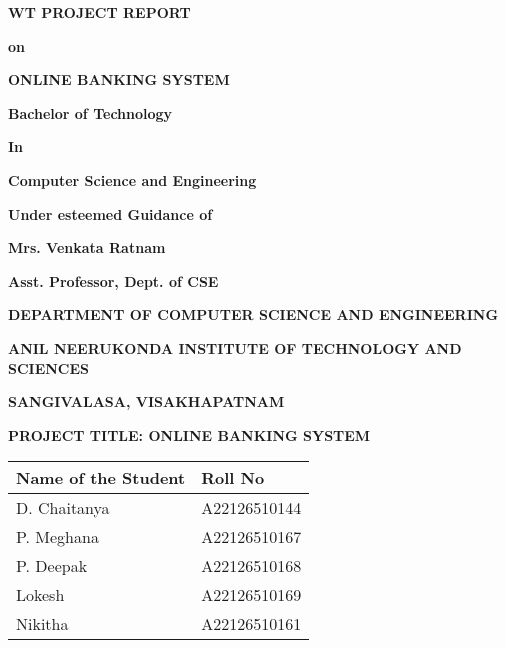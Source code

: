 \documentclass[12pt,a4paper]{report}
\begin{document}
\begin{titlepage}
    \centering
    \vspace*{1cm}
    {\huge\bfseries WT PROJECT REPORT\par}
    \vspace{1cm}
    {\Large\bfseries on\par}
    \vspace{1cm}
    {\huge\bfseries ONLINE BANKING SYSTEM\par}
    \vspace{2cm}
    {\Large\bfseries Bachelor of Technology\par}
    \vspace{0.5cm}
    {\Large\bfseries In\par}
    \vspace{0.5cm}
    {\Large\bfseries Computer Science and Engineering\par}
    \vspace{2cm}
    {\Large\bfseries Under esteemed Guidance of\par}
    \vspace{0.5cm}
    {\Large\bfseries Mrs. Venkata Ratnam\par}
    \vspace{0.5cm}
    {\Large\bfseries Asst. Professor, Dept. of CSE\par}
    \vspace{2cm}
    {\Large\bfseries DEPARTMENT OF COMPUTER SCIENCE AND ENGINEERING\par}
    \vspace{0.5cm}
    {\Large\bfseries ANIL NEERUKONDA INSTITUTE OF TECHNOLOGY AND SCIENCES\par}
    \vspace{0.5cm}
    {\Large\bfseries SANGIVALASA, VISAKHAPATNAM\par}
\end{titlepage}

\thispagestyle{empty}
\begin{center}
    \LARGE\textbf{PROJECT TITLE: ONLINE BANKING SYSTEM}\\
    \vspace{2cm}

    \begin{tabular}{|l|l|}
        \hline
        \textbf{Name of the Student} & \textbf{Roll No} \\
        \hline
        D. Chaitanya & A22126510144 \\
        \hline
        P. Meghana & A22126510167 \\
        \hline
        P. Deepak & A22126510168 \\
        \hline
        Lokesh & A22126510169 \\
        \hline
        Nikitha & A22126510161 \\
        \hline
    \end{tabular}
\end{center}
\newpage
\end{document}
